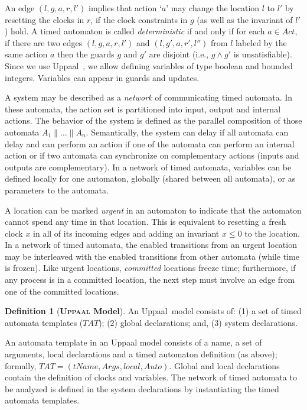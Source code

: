\documentclass[copyright,creativecommons]{eptcs}
\theoremstyle{definition}
\newtheorem{definition}{Definition}
\newcommand{\id}[1]{\mathit{#1}}
\newcommand{\Act}{\textit{Act}\xspace}
\newcommand{\Uppaal}{{\sc Uppaal}\xspace}
\begin{document}
An edge  $(l ,g,a,r, l')$ implies that action `$a$' may change the location $l$ to $l'$ by resetting the clocks in $r$,  if the clock constraints in $g$ (as well as the invariant of $l'$) hold.
A timed automaton is called {\em deterministic} if and only if for
each $a \in \Act$, if there are two edges $(l ,g,a,r, l')$ and $(l ,g',a,r', l'')$ from $l$ labeled by the same
action $a$
then the guards $g$ and $g'$ are disjoint (i.e., $g \wedge g'$ is unsatisfiable).
Since we use \Uppaal~\cite{LarsenPY97}, we allow defining variables of type boolean
and bounded integers. Variables can appear in
guards and updates.










A system may be described as a {\em network} of communicating timed automata. In these automata, the action set is partitioned into input, output and internal actions.
The behavior of the system is defined as the parallel composition of those automata $A_1 \parallel \dots \parallel A_n$. Semantically, the system can delay if all automata can delay and can perform an action if one of the automata can perform an internal action or if two automata can synchronize on complementary actions (inputs and outputs are complementary).
In a network of timed automata, variables can be defined locally for one automaton, globally (shared between all automata), or as  parameters to the automata.

A location can be marked  {\em urgent} in an automaton to indicate that the automaton cannot spend any time in that location. This is equivalent to resetting a fresh clock $x$ in all of its incoming edges and adding an invariant $x \le 0$ to the location.
In a network of timed automata, the enabled transitions from an urgent location may be interleaved with the enabled transitions from other automata (while time is frozen).
Like urgent locations, {\em committed} locations freeze time; furthermore, if any process is in a committed location, the next step must involve an edge from one of the committed locations.


\begin{definition}[\bf {\textsc {\bfseries Uppaal}} Model]
An \Uppaal\ model consists of: (1)  a set of timed automata templates ($\id{TAT}$); (2) global declarations; and, (3) system declarations.
\end{definition}

An automata template in an \Uppaal model consists of a name, a set of arguments, local declarations and a timed automaton definition (as above); formally, $\id{TAT} = (\id{tName}, \id{Args}, \id{local}, \id{Auto})$.
Global and local declarations contain the definition of clocks and variables.
The network of timed automata to be analyzed is defined in the system declarations by instantiating the timed automata templates.
\end{document}
